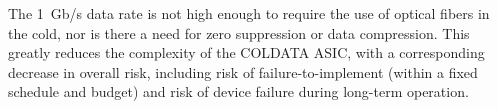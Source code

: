 The 1~Gb/s data rate is not high enough to require the use of optical fibers in the cold,
nor is there a need for zero suppression or data compression.
This greatly reduces the complexity of the COLDATA ASIC, with a corresponding decrease in overall risk,
including risk of failure-to-implement (within a fixed schedule and budget)
and risk of device failure during long-term operation.

